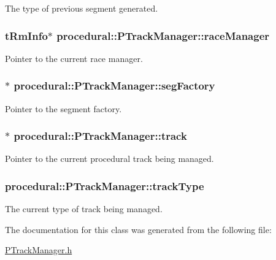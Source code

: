 The type of previous segment generated. \hypertarget{classprocedural_1_1_p_track_manager_a94e0584899b041265487236a8369969b}{
\subsubsection[{race\-Manager}]{\setlength{\rightskip}{0pt plus 5cm}t\-Rm\-Info$\ast$ procedural\-::\-P\-Track\-Manager\-::race\-Manager\hspace{0.3cm}{\ttfamily [private]}}}\label{classprocedural_1_1_p_track_manager_a94e0584899b041265487236a8369969b}
Pointer to the current race manager. \hypertarget{classprocedural_1_1_p_track_manager_a9382031b01b92a1b06de89f41c71bcf4}{
\subsubsection[{seg\-Factory}]{$\ast$ procedural\-::\-P\-Track\-Manager\-::seg\-Factory\hspace{0.3cm}{\ttfamily [private]}}}\label{classprocedural_1_1_p_track_manager_a9382031b01b92a1b06de89f41c71bcf4}
Pointer to the segment factory. \hypertarget{classprocedural_1_1_p_track_manager_ad648fdfaf8fc5bc7ede73760e473f325}{
\subsubsection[{track}]{$\ast$ procedural\-::\-P\-Track\-Manager\-::track\hspace{0.3cm}{\ttfamily [private]}}}\label{classprocedural_1_1_p_track_manager_ad648fdfaf8fc5bc7ede73760e473f325}
Pointer to the current procedural track being managed. \hypertarget{classprocedural_1_1_p_track_manager_a30f77747073f21bc648bd04cc3f4b5dd}{
\subsubsection[{track\-Type}]{ procedural\-::\-P\-Track\-Manager\-::track\-Type\hspace{0.3cm}{\ttfamily [private]}}}\label{classprocedural_1_1_p_track_manager_a30f77747073f21bc648bd04cc3f4b5dd}
The current type of track being managed. 

The documentation for this class was generated from the following file\-:\begin{DoxyCompactItemize}
\item 
\hyperlink{_p_track_manager_8h}{P\-Track\-Manager.\-h}\end{DoxyCompactItemize}
